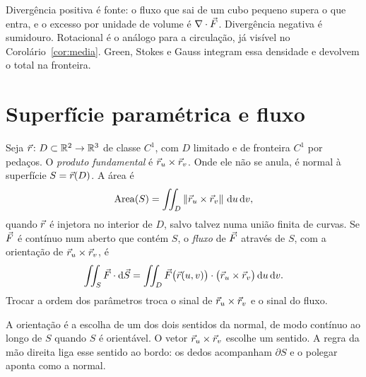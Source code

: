 \documentclass[11pt,a4paper]{article}
\begin{document}
\begin{intuicao}
Divergência positiva é fonte: o fluxo que sai de um cubo pequeno supera o que entra, e o excesso por unidade de volume é $\nabla\cdot\vec{F}$. Divergência negativa é sumidouro. Rotacional é o análogo para a circulação, já visível no Corolário~\ref{cor:media}. Green, Stokes e Gauss integram essa densidade e devolvem o total na fronteira.
\end{intuicao}

\section{Superfície paramétrica e fluxo}

\begin{definicao}
Seja $\vec{r}\colon D\subset\mathbb{R}^2\to\mathbb{R}^3$ de classe $C^1$, com $D$ limitado e de fronteira $C^1$ por pedaços. O \emph{produto fundamental} é $\vec{r}_u\times\vec{r}_v$. Onde ele não se anula, é normal à superfície $S=\vec{r}(D)$. A área é
\[
\mathrm{Area}(S)=\iint_D\left\lVert \vec{r}_u\times\vec{r}_v \right\rVert\,\mathrm{d} u\,\mathrm{d} v,
\]
quando $\vec{r}$ é injetora no interior de $D$, salvo talvez numa união finita de curvas. Se $\vec{F}$ é contínuo num aberto que contém $S$, o \emph{fluxo} de $\vec{F}$ através de $S$, com a orientação de $\vec{r}_u\times\vec{r}_v$, é
\[
\iint_S\vec{F}\cdot\mathrm{d}\vec{S}
=\iint_D\vec{F}\bigl(\vec{r}(u,v)\bigr)\cdot\bigl(\vec{r}_u\times\vec{r}_v\bigr)\,\mathrm{d} u\,\mathrm{d} v.
\]
Trocar a ordem dos parâmetros troca o sinal de $\vec{r}_u\times\vec{r}_v$ e o sinal do fluxo.
\end{definicao}

A orientação é a escolha de um dos dois sentidos da normal, de modo contínuo ao longo de $S$ quando $S$ é orientável. O vetor $\vec{r}_u\times\vec{r}_v$ escolhe um sentido. A regra da mão direita liga esse sentido ao bordo: os dedos acompanham $\partial S$ e o polegar aponta como a normal.
\end{document}

